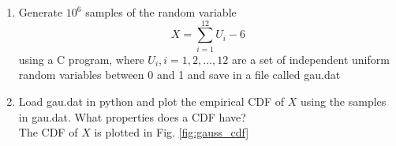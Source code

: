 \documentclass[10pt, a4paper]{article}
\begin{document}
\begin{enumerate}

%
\item
Generate $10^6$ samples of the random variable
%
\begin{equation}
X = \sum_{i=1}^{12}U_i -6
\end{equation}
%
using a C program, where $U_i, i = 1,2,\dots, 12$ are  a set of independent uniform random variables between 0 and 1
and save in a file called gau.dat

\begin{center}
\end{center}

\item
Load gau.dat in python and plot the empirical CDF of $X$ using the samples in gau.dat. What properties does a CDF have?
\\
\solution The CDF of $X$ is plotted in Fig. \ref{fig:gauss_cdf}
\begin{center}
\end{center}


\end{enumerate}
\end{document}
